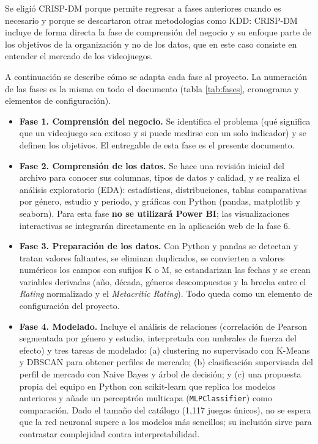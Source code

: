 \documentclass[letterpaper,11pt]{article}
\begin{document}
Se eligió CRISP-DM porque permite regresar a fases anteriores cuando es necesario y porque se descartaron otras metodologías como KDD: CRISP-DM incluye de forma directa la fase de comprensión del negocio y su enfoque parte de los objetivos de la organización y no de los datos, que en este caso consiste en entender el mercado de los videojuegos.

A continuación se describe cómo se adapta cada fase al proyecto. La numeración de las fases es la misma en todo el documento (tabla \ref{tab:fases}, cronograma y elementos de configuración).

\begin{itemize}
  \item \textbf{Fase 1. Comprensión del negocio.} Se identifica el problema (qué significa que un videojuego sea exitoso y si puede medirse con un solo indicador) y se definen los objetivos. El entregable de esta fase es el presente documento.
  \item \textbf{Fase 2. Comprensión de los datos.} Se hace una revisión inicial del archivo para conocer sus columnas, tipos de datos y calidad, y se realiza el análisis exploratorio (EDA): estadísticas, distribuciones, tablas comparativas por género, estudio y periodo, y gráficas con Python (pandas, matplotlib y seaborn). Para esta fase \textbf{no se utilizará Power BI}; las visualizaciones interactivas se integrarán directamente en la aplicación web de la fase 6.
  \item \textbf{Fase 3. Preparación de los datos.} Con Python y pandas se detectan y tratan valores faltantes, se eliminan duplicados, se convierten a valores numéricos los campos con sufijos K o M, se estandarizan las fechas y se crean variables derivadas (año, década, géneros descompuestos y la brecha entre el \textit{Rating} normalizado y el \textit{Metacritic Rating}). Todo queda como un elemento de configuración del proyecto.
  \item \textbf{Fase 4. Modelado.} Incluye el análisis de relaciones (correlación de Pearson segmentada por género y estudio, interpretada con umbrales de fuerza del efecto) y tres tareas de modelado: (a) clustering no supervisado con K-Means y DBSCAN para obtener perfiles de mercado; (b) clasificación supervisada del perfil de mercado con Naive Bayes y árbol de decisión; y (c) una propuesta propia del equipo en Python con scikit-learn que replica los modelos anteriores y añade un perceptrón multicapa (\texttt{MLPClassifier}) como comparación. Dado el tamaño del catálogo (1,117 juegos únicos), no se espera que la red neuronal supere a los modelos más sencillos; su inclusión sirve para contrastar complejidad contra interpretabilidad.

\end{itemize}
\end{document}

